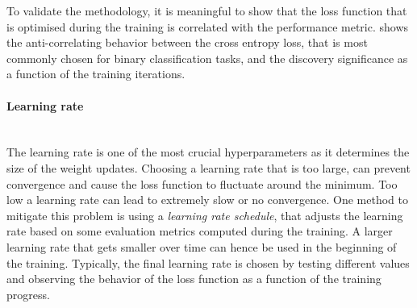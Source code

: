 To validate the methodology, it is meaningful to show that the loss function that is optimised during the training is correlated with the performance metric. 
 shows the anti-correlating behavior between the cross entropy loss, that is most commonly chosen for binary classification tasks, and the discovery significance as a function of the training iterations.



\paragraph{Learning rate} \mbox{}\\
The learning rate is one of the most crucial hyperparameters as it determines the size of the weight updates. Choosing a learning rate that is too large, can prevent convergence and cause the loss function to fluctuate around the minimum. Too low a learning rate can lead to extremely slow or no convergence. 
One method to mitigate this problem is using a \emph{learning rate schedule}, that adjusts the learning rate based on some evaluation metrics computed during the training. A larger learning rate that gets smaller over time can hence be used in the beginning of the training. 
Typically, the final learning rate is chosen by testing different values and observing the behavior of the loss function as a function of the training progress.


